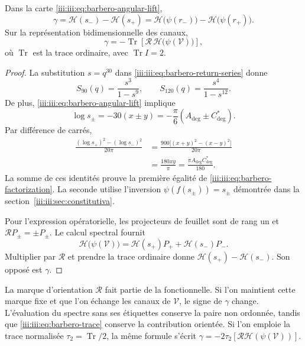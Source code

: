 \begin{theorem}
\label{iii:iii:thm:barbero-factorization}
Dans la carte \eqref{iii:iii:eq:barbero-angular-lift},
\begin{equation}
 \gamma=\mathcal H(s_-)-\mathcal H(s_+)
       =\mathcal H\bigl(\psi(r_-)\bigr)
        -\mathcal H\bigl(\psi(r_+)\bigr).
 \label{iii:iii:eq:barbero-factorization}
\end{equation}
Sur la représentation bidimensionnelle des canaux,
\begin{equation}
 \gamma=-\operatorname{Tr}
    \left[\mathcal R\,\mathcal H\bigl(\psi(\mathcal V)\bigr)\right],
 \label{iii:iii:eq:barbero-trace}
\end{equation}
où $\operatorname{Tr}$ est la trace ordinaire, avec
$\operatorname{Tr}I=2$.
\end{theorem}
\begin{proof}
La substitution $s=q^{30}$ dans \eqref{iii:iii:eq:barbero-return-series} donne
\[
 S_{90}(q)=\frac{s^3}{1-s^9},\qquad
 S_{120}(q)=\frac{s^4}{1-s^{12}}.
\]
De plus, \eqref{iii:iii:eq:barbero-angular-lift} implique
\[
 \log s_\pm=-30(x\pm y)
 =-\frac\pi6(A_{\deg}\pm C^*_{\deg}).
\]
Par différence de carrés,
\begin{align}
 \frac{(\log s_+)^2-(\log s_-)^2}{20\pi}
 &=\frac{900\bigl[(x+y)^2-(x-y)^2\bigr]}{20\pi}\\
 &=\frac{180xy}{\pi}
 =\frac{\pi A_{\deg}C^*_{\deg}}{180}.
 \label{iii:iii:eq:barbero-log-term}
\end{align}
La somme de ces identités prouve la première égalité de
\eqref{iii:iii:eq:barbero-factorization}. La seconde utilise l’inversion
$\psi(f(s_\pm))=s_\pm$ démontrée dans la
section~\ref{iii:iii:sec:constitutiva}.

Pour l’expression opératorielle, les projecteurs de feuillet sont de rang un et
$\mathcal RP_\pm=\pm P_\pm$. Le calcul spectral fournit
\[
 \mathcal H\bigl(\psi(\mathcal V)\bigr)
 =\mathcal H(s_+)P_++\mathcal H(s_-)P_-.
\]
Multiplier par $\mathcal R$ et prendre la trace ordinaire donne
$\mathcal H(s_+)-\mathcal H(s_-)$. Son opposé est $\gamma$.
\end{proof}

La marque d’orientation $\mathcal R$ fait partie de la fonctionnelle. Si
l’on maintient cette marque fixe et que l’on échange les canaux de $\mathcal V$,
le signe de $\gamma$ change. L’évaluation du spectre sans ses étiquettes conserve
la paire non ordonnée, tandis que \eqref{iii:iii:eq:barbero-trace} conserve la
contribution orientée. Si l’on emploie la trace normalisée
$\tau_2=\operatorname{Tr}/2$, la même formule s’écrit
$\gamma=-2\tau_2[\mathcal R\mathcal H(\psi(\mathcal V))]$.

